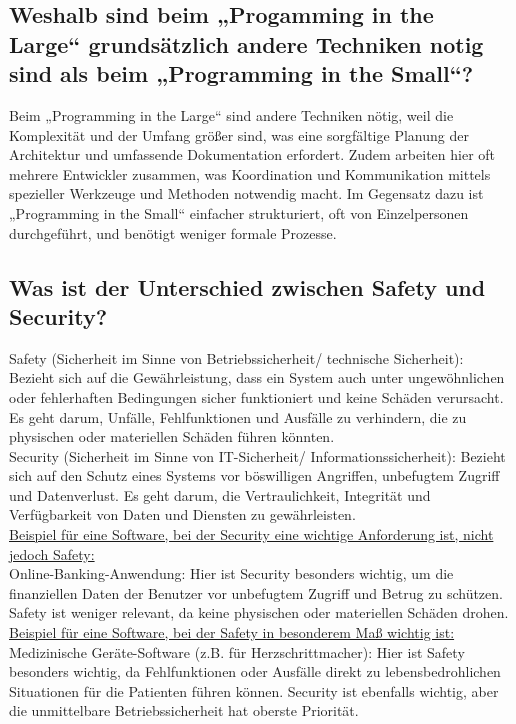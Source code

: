 \documentclass{article}
\begin{document}
\subsection*{Weshalb sind beim „Progamming in the Large“ grundsätzlich andere
Techniken notig sind als beim „Programming in the Small“?}
Beim „Programming in the Large“ sind andere Techniken nötig, weil die Komplexität und der Umfang größer sind, was eine sorgfältige Planung der Architektur und umfassende Dokumentation erfordert. Zudem arbeiten hier oft mehrere Entwickler zusammen, was Koordination und Kommunikation mittels spezieller Werkzeuge und Methoden notwendig macht. Im Gegensatz dazu ist „Programming in the Small“ einfacher strukturiert, oft von Einzelpersonen durchgeführt, und benötigt weniger formale Prozesse.

\subsection*{Was ist der Unterschied zwischen Safety und Security?}

Safety (Sicherheit im Sinne von Betriebssicherheit/ technische Sicherheit): Bezieht sich auf die Gewährleistung, dass ein System auch unter ungewöhnlichen oder fehlerhaften Bedingungen sicher funktioniert und keine Schäden verursacht. Es geht darum, Unfälle, Fehlfunktionen und Ausfälle zu verhindern, die zu physischen oder materiellen Schäden führen könnten.\\
Security (Sicherheit im Sinne von IT-Sicherheit/ Informationssicherheit): Bezieht sich auf den Schutz eines Systems vor böswilligen Angriffen, unbefugtem Zugriff und Datenverlust. Es geht darum, die Vertraulichkeit, Integrität und Verfügbarkeit von Daten und Diensten zu gewährleisten.\\

\underline{Beispiel für eine Software, bei der Security eine wichtige Anforderung ist, nicht jedoch Safety:}\\
Online-Banking-Anwendung: Hier ist Security besonders wichtig, um die finanziellen Daten der Benutzer vor unbefugtem Zugriff und Betrug zu schützen. Safety ist weniger relevant, da keine physischen oder materiellen Schäden drohen.\\
\underline{Beispiel für eine Software, bei der Safety in besonderem Maß wichtig ist:}\\
Medizinische Geräte-Software (z.B. für Herzschrittmacher): Hier ist Safety besonders wichtig, da Fehlfunktionen oder Ausfälle direkt zu lebensbedrohlichen Situationen für die Patienten führen können. Security ist ebenfalls wichtig, aber die unmittelbare Betriebssicherheit hat oberste Priorität.
\end{document}
